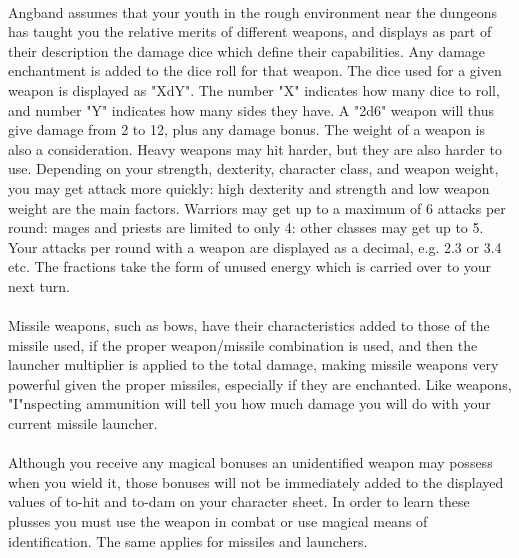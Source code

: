 \paragraph{}
Angband assumes that your youth in the rough environment near the
dungeons has taught you the relative merits of different weapons, and
displays as part of their description the damage dice which define their
capabilities. Any damage enchantment is added to the dice roll for that
weapon. The dice used for a given weapon is displayed as "XdY". The
number "X" indicates how many dice to roll, and number "Y" indicates how
many sides they have. A "2d6" weapon will thus give damage from 2 to 12,
plus any damage bonus. The weight of a weapon is also a consideration.
Heavy weapons may hit harder, but they are also harder to use.
Depending on your strength, dexterity, character class, and weapon
weight, you may get attack more quickly: high dexterity and strength and
low weapon weight are the main factors. Warriors may get up to a maximum
of 6 attacks per round: mages and priests are limited to only 4: other
classes may get up to 5. Your attacks per round with a weapon are
displayed as a decimal, e.g. 2.3 or 3.4 etc. The fractions take the form
of unused energy which is carried over to your next turn.

\paragraph{}
Missile weapons, such as bows, have their characteristics added to those
of the missile used, if the proper weapon/missile combination is used,
and then the launcher multiplier is applied to the total damage, making
missile weapons very powerful given the proper missiles, especially if
they are enchanted. Like weapons, "I"nspecting ammunition will tell you
how much damage you will do with your current missile launcher.

\paragraph{}
Although you receive any magical bonuses an unidentified weapon may possess
when you wield it, those bonuses will not be immediately added to the
displayed values of to-hit and to-dam on your character sheet. In order to
learn these plusses you must use the weapon in combat or use magical means of
identification. The same applies for missiles and launchers.

